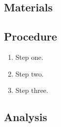 \subsection{Materials}

\subsection{Procedure}
\begin{enumerate}
  \item Step one.
  \item Step two.
  \item Step three.
\end{enumerate}

\subsection{Analysis}
